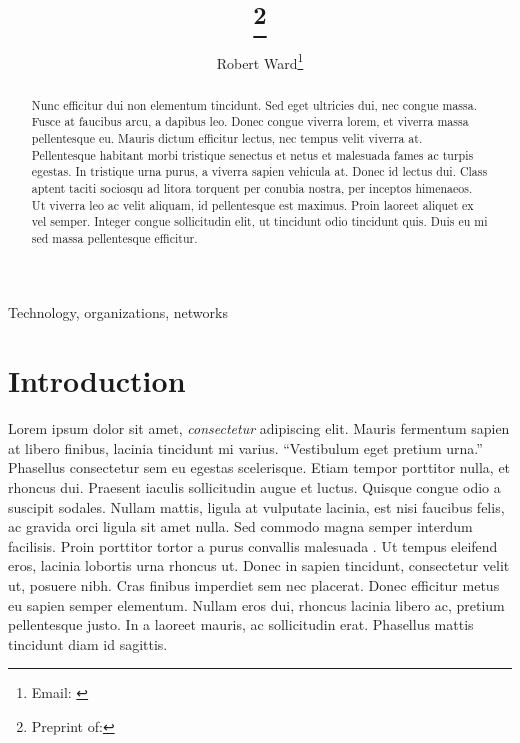 \documentclass[12pt,letterpaper]{article} %
\begin{document}
	
\title{\sffamily\textbf{\papertitle}	\footnote{{Preprint of: \papercitation}}}
\author[]{Robert Ward\footnote{Email: \href{mailto:\myemail}{\myemail}}} 
\date{\paperdate}


\maketitle

\begin{abstract}
Nunc efficitur dui non elementum tincidunt. Sed eget ultricies dui, nec congue massa. Fusce at faucibus arcu, a dapibus leo. Donec congue viverra lorem, et viverra massa pellentesque eu. Mauris dictum efficitur lectus, nec tempus velit viverra at. Pellentesque habitant morbi tristique senectus et netus et malesuada fames ac turpis egestas. In tristique urna purus, a viverra sapien vehicula at. Donec id lectus dui. Class aptent taciti sociosqu ad litora torquent per conubia nostra, per inceptos himenaeos. Ut viverra leo ac velit aliquam, id pellentesque est maximus. Proin laoreet aliquet ex vel semper. Integer congue sollicitudin elit, ut tincidunt odio tincidunt quis. Duis eu mi sed massa pellentesque efficitur.
\end{abstract}

{} Technology, organizations, networks

\clearpage

\section*{Introduction}

Lorem ipsum dolor sit amet, \emph{consectetur} adipiscing elit. Mauris fermentum sapien at libero finibus, lacinia tincidunt mi varius. \enquote{Vestibulum eget pretium urna.} Phasellus consectetur sem eu egestas scelerisque. Etiam tempor porttitor nulla, et rhoncus dui. Praesent iaculis sollicitudin augue et luctus. Quisque congue odio a suscipit sodales. Nullam mattis, ligula at vulputate lacinia, est nisi faucibus felis, ac gravida orci ligula sit amet nulla. Sed commodo magna semper interdum facilisis. Proin porttitor tortor a purus convallis malesuada \citep{leahey_prominent_2017}. Ut tempus eleifend eros, lacinia lobortis urna rhoncus ut. Donec in sapien tincidunt, consectetur velit ut, posuere nibh. Cras finibus imperdiet sem nec placerat. Donec efficitur metus eu sapien semper elementum. Nullam eros dui, rhoncus lacinia libero ac, pretium pellentesque justo. In a laoreet mauris, ac sollicitudin erat. Phasellus mattis tincidunt diam id sagittis.
\end{document}
